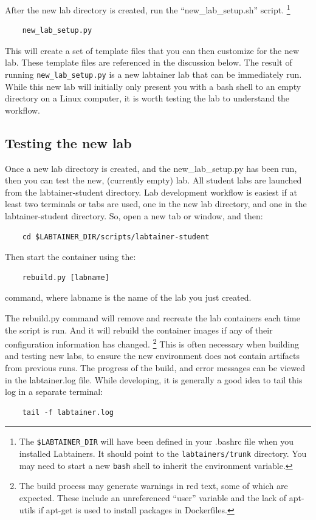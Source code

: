\documentclass[12pt]{article}
\begin{document}
\noindent After the new lab directory is created, run the ``new\_lab\_setup.sh'' script.
\footnote {The {\tt \$LABTAINER\_DIR} will have been defined in your .bashrc
file when you installed Labtainers.  It should point to the {\tt labtainers/trunk}
directory.  You may need to start a new {\tt bash} shell to inherit the environment
variable.}

\begin{verbatim}
    new_lab_setup.py
\end{verbatim}
This will create a set of template files that you can then customize
for the new lab.  These template files are referenced in the discussion
below.
The result of running {\tt new\_lab\_setup.py} is a new labtainer lab that can be immediately run.  
While this new lab will initially only present you with a bash shell to an
empty directory on a Linux computer, it is worth testing the lab to understand the workflow.

\subsection{Testing the new lab}
Once a new lab directory is created, and the new\_lab\_setup.py has been run, then 
you can test the new, (currently empty) lab.  All student labs are launched from the
labtainer-student directory.  Lab development workflow is easiest if at least two
terminals or tabs are used, one in the new lab directory, and one in the labtainer-student
directory.  So, open a new tab or window, and then:

\begin{verbatim}
    cd $LABTAINER_DIR/scripts/labtainer-student
\end{verbatim}
Then start the container using the:

\begin{verbatim}
    rebuild.py [labname] 
\end{verbatim}
command, where labname is the name of the lab you just created.  

The rebuild.py command will remove and recreate the lab containers
each time the script is run.  And it will rebuild the container images if any of their configuration 
information has changed.  \footnote{The build process may generate warnings in red text, some of which are expected.  
These include an unreferenced ``user'' variable and the lack of apt-utils if apt-get is used to install packages in 
Dockerfiles.}  This is often necessary when building and testing new labs, to ensure the
new environment does not contain artifacts from previous runs.
The progress of the build, and error messages can be viewed in 
the labtainer.log file.  While developing, it is generally a good idea to tail this log in
a separate terminal:
\begin{verbatim}
    tail -f labtainer.log
\end{verbatim}
\end{document}
